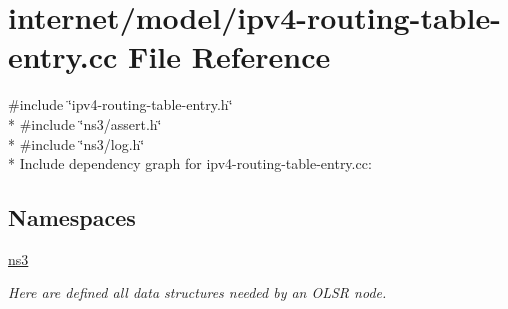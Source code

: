 \hypertarget{ipv4-routing-table-entry_8cc}{}\section{internet/model/ipv4-\/routing-\/table-\/entry.cc File Reference}
\label{ipv4-routing-table-entry_8cc}
{\ttfamily \#include \char`\"{}ipv4-\/routing-\/table-\/entry.\+h\char`\"{}}\\*
{\ttfamily \#include \char`\"{}ns3/assert.\+h\char`\"{}}\\*
{\ttfamily \#include \char`\"{}ns3/log.\+h\char`\"{}}\\*
Include dependency graph for ipv4-\/routing-\/table-\/entry.cc\+:
\subsection*{Namespaces}
\begin{DoxyCompactItemize}
\item 
 \hyperlink{namespacens3}{ns3}
\begin{DoxyCompactList}\small\item\em Here are defined all data structures needed by an O\+L\+SR node. \end{DoxyCompactList}\end{DoxyCompactItemize}
